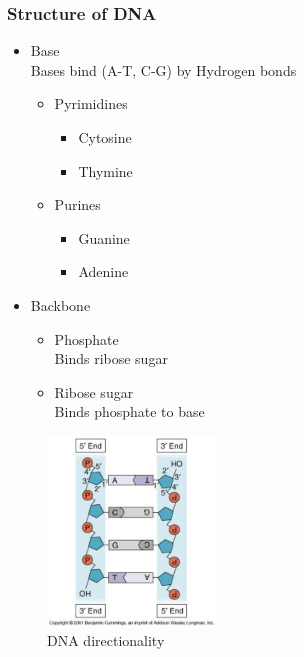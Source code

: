 \documentclass[a4paper]{article}
\begin{document}
\subsubsection{Structure of DNA}

\begin{itemize}
  \item Base \\
    Bases bind (A-T, C-G) by Hydrogen bonds
    \begin{itemize}
      \item Pyrimidines
        \begin{itemize}
          \item Cytosine
          \item Thymine
        \end{itemize}
      \item Purines
        \begin{itemize}
          \item Guanine
          \item Adenine
        \end{itemize}
    \end{itemize}
  \item Backbone
    \begin{itemize}
      \item Phosphate \\
        Binds ribose sugar
      \item Ribose sugar \\
        Binds phosphate to base
    \end{itemize}
\end{itemize}


\begin{figure}[h!]
  \centering
  \includegraphics[width=0.4\textwidth]{graphics/dna_directionality.eps}
  \caption{DNA directionality}
  \label{fig:eukaryotic_cell}
\end{figure}
\FloatBarrier
\end{document}
